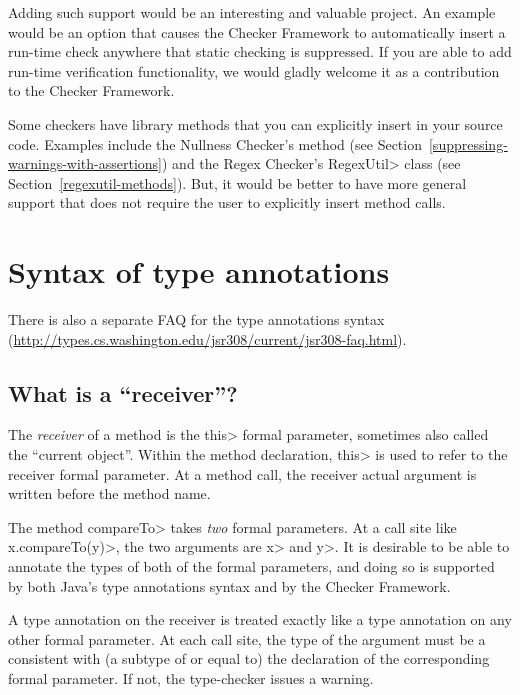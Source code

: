 Adding such support would be an interesting and valuable project.
An example would be an option that causes the Checker Framework to
automatically insert a run-time check anywhere that static checking is
suppressed.
If you
are able to add run-time verification functionality, we would gladly
welcome it as a contribution to the Checker Framework.

Some checkers have library methods that you can explicitly insert in your
source code.
Examples include the Nullness Checker's
 method (see
Section~\ref{suppressing-warnings-with-assertions}) and the Regex Checker's
\<RegexUtil> class (see Section~\ref{regexutil-methods}).
But, it would be better to have more general support that does not require
the user to explicitly insert method calls.


\section{Syntax of type annotations\label{faq-syntax-section}}

There is also a separate FAQ for the type annotations syntax
(\url{http://types.cs.washington.edu/jsr308/current/jsr308-faq.html}).


\subsection{What is a ``receiver''?\label{faq-receiver}}

The \emph{receiver} of a method is the \<this> formal parameter, sometimes
also called the ``current object''.  Within the method declaration, \<this>
is used to refer to the receiver formal parameter.  At a method call, the
receiver actual argument is written before the method name.

The method \<compareTo> takes \emph{two} formal parameters.  At a call site
like \<x.compareTo(y)>, the two arguments are \<x> and \<y>.  It is
desirable to be able to annotate the types of both of the formal
parameters, and doing so is supported by both Java's type annotations
syntax and by the Checker Framework.

A type annotation on the receiver is treated exactly like a type annotation
on any other formal parameter.  At each call site, the type of the argument
must be a consistent with (a subtype of or equal to) the declaration of the
corresponding formal parameter.  If not, the type-checker issues a warning.


